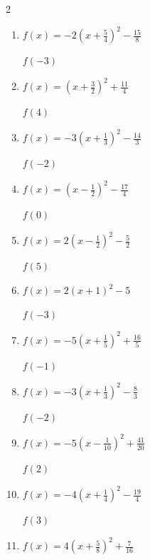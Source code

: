 \begin{multicols}{2}
\begin{enumerate}
$f(0)$
        \phantom{$=-2$}

  \item $\displaystyle f(x)=-2\left( x+\frac{5}{4}\right)^{2}-\frac{15}{8}$

$f(-3)$
        \phantom{$=-8$}

  \item $\displaystyle f(x)=\left( x+\frac{3}{2}\right)^{2}+\frac{11}{4}$

$f(4)$
        \phantom{$=33$}

  \item $\displaystyle f(x)=-3\left( x+\frac{1}{3}\right)^{2}-\frac{14}{3}$

$f(-2)$
        \phantom{$=-13$}

\columnbreak %

  \item $\displaystyle f(x)=\left( x-\frac{1}{2}\right)^{2}-\frac{17}{4}$

$f(0)$
        \phantom{$=-4$}

  \item $\displaystyle f(x)=2\left( x-\frac{1}{2}\right)^{2}-\frac{5}{2}$

$f(5)$
        \phantom{$=38$}

  \item $\displaystyle f(x)=2\left( x+1\right)^{2}-5$

$f(-3)$
        \phantom{$=3$}

  \item $\displaystyle f(x)=-5\left( x+\frac{1}{5}\right)^{2}+\frac{16}{5}$

$f(-1)$
        \phantom{$=0$}

  \item $\displaystyle f(x)=-3\left( x+\frac{1}{3}\right)^{2}-\frac{8}{3}$

$f(-2)$
        \phantom{$=-11$}

\columnbreak %

\resetques

  \item $\displaystyle f(x)=-5\left( x-\frac{1}{10}\right)^{2}+\frac{41}{20}$

$f(2)$
        \phantom{$=-16$}

  \item $\displaystyle f(x)=-4\left( x+\frac{1}{4}\right)^{2}-\frac{19}{4}$

$f(3)$
        \phantom{$=-47$}

  \item $\displaystyle f(x)=4\left( x+\frac{5}{8}\right)^{2}+\frac{7}{16}$


\end{enumerate}
\end{multicols}

